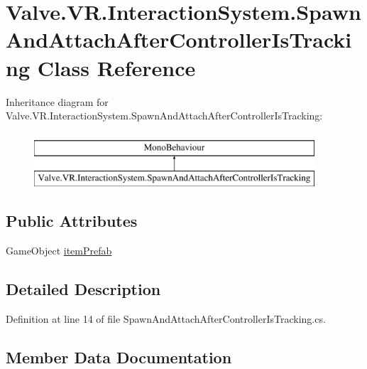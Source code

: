 \hypertarget{class_valve_1_1_v_r_1_1_interaction_system_1_1_spawn_and_attach_after_controller_is_tracking}{}\section{Valve.\+V\+R.\+Interaction\+System.\+Spawn\+And\+Attach\+After\+Controller\+Is\+Tracking Class Reference}
\label{class_valve_1_1_v_r_1_1_interaction_system_1_1_spawn_and_attach_after_controller_is_tracking}
Inheritance diagram for Valve.\+V\+R.\+Interaction\+System.\+Spawn\+And\+Attach\+After\+Controller\+Is\+Tracking\+:\begin{figure}[H]
\begin{center}
\leavevmode
\includegraphics[height=2.000000cm]{class_valve_1_1_v_r_1_1_interaction_system_1_1_spawn_and_attach_after_controller_is_tracking}
\end{center}
\end{figure}
\subsection*{Public Attributes}
\begin{DoxyCompactItemize}
\item 
Game\+Object \mbox{\hyperlink{class_valve_1_1_v_r_1_1_interaction_system_1_1_spawn_and_attach_after_controller_is_tracking_ad1ed96258f204b1212922540249271cd}{item\+Prefab}}
\end{DoxyCompactItemize}


\subsection{Detailed Description}


Definition at line 14 of file Spawn\+And\+Attach\+After\+Controller\+Is\+Tracking.\+cs.



\subsection{Member Data Documentation}
\mbox{\label{class_valve_1_1_v_r_1_1_interaction_system_1_1_spawn_and_attach_after_controller_is_tracking_ad1ed96258f204b1212922540249271cd}} 
